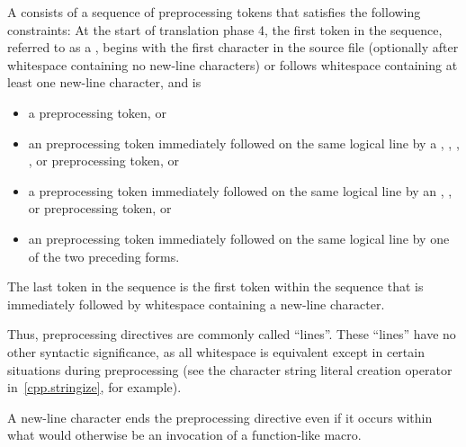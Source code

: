 \begin{bnf}
\br
\end{bnf}

\pnum
A  consists of a sequence of preprocessing tokens
that satisfies the following constraints:
At the start of translation phase 4,
the first token in the sequence,
referred to as a ,
begins with the first character in the source file
(optionally after whitespace containing no new-line characters) or
follows whitespace containing at least one new-line character,
and is

\begin{itemize}
\item
a \tcode{\#} preprocessing token, or

\item
an  preprocessing token
immediately followed on the same logical line by a
,
\tcode{<},
,
, or
\tcode{:}
preprocessing token, or

\item
a  preprocessing token
immediately followed on the same logical line by an
,
\tcode{:}, or
\tcode{;}
preprocessing token, or

\item
an  preprocessing token
immediately followed on the same logical line by
one of the two preceding forms.
\end{itemize}

The last token in the sequence is the first token within the sequence that
is immediately followed by whitespace containing a new-line character.
\begin{footnote}
Thus,
preprocessing directives are commonly called ``lines''.
These ``lines'' have no other syntactic significance,
as all whitespace is equivalent except in certain situations
during preprocessing (see the
\tcode{\#}
character string literal creation operator in~\ref{cpp.stringize}, for example).
\end{footnote}
\begin{note}
A new-line character ends the preprocessing directive even if it occurs
within what would otherwise be an invocation of a function-like macro.
\end{note}

